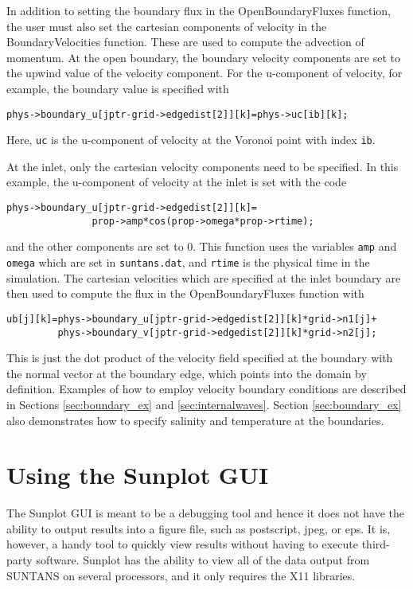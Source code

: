 \documentclass[12pt,oneside]{article}
\begin{document}
In addition to setting
the boundary flux in the OpenBoundaryFluxes function, the user must also set the cartesian components
of velocity in the BoundaryVelocities function.  These are used to compute the advection of momentum.
At the open boundary, the boundary velocity components are set to the upwind value of the velocity
component.  For the u-component of velocity, for example, the boundary value is specified
with
\begin{verbatim}
phys->boundary_u[jptr-grid->edgedist[2]][k]=phys->uc[ib][k];
\end{verbatim}
Here, \verb+uc+ is the u-component of velocity at the Voronoi point with index \verb+ib+.

At the inlet, only the cartesian velocity components need to be specified.  In this example,
the u-component of velocity at the inlet is set with the code
\begin{verbatim}
phys->boundary_u[jptr-grid->edgedist[2]][k]=
               prop->amp*cos(prop->omega*prop->rtime);
\end{verbatim}
and the other components are set to 0.  This function uses the variables \verb+amp+ and \verb+omega+
which are set in \verb+suntans.dat+, and \verb+rtime+ is the physical time in the simulation.
The cartesian velocities which are specified at the inlet boundary are then used to compute
the flux in the OpenBoundaryFluxes function with
\begin{verbatim}
ub[j][k]=phys->boundary_u[jptr-grid->edgedist[2]][k]*grid->n1[j]+
         phys->boundary_v[jptr-grid->edgedist[2]][k]*grid->n2[j];
\end{verbatim}
This is just the dot product of the velocity field specified at the boundary with the
normal vector at the boundary edge, which points into the domain by definition.
Examples of how to employ velocity boundary conditions are described in Sections \ref{sec:boundary_ex}
and \ref{sec:internalwaves}.  Section \ref{sec:boundary_ex} also demonstrates 
how to specify salinity and temperature at the boundaries.

\section{Using the Sunplot GUI}

The Sunplot GUI is meant to be a debugging tool and hence it does not have the ability to output
results into a figure file, such as postscript, jpeg, or eps.  It is, however, a handy tool to
quickly view results without having to execute third-party software.  Sunplot has the ability to
view all of the data output from SUNTANS on several processors, and it only requires the X11 libraries.
\end{document}
